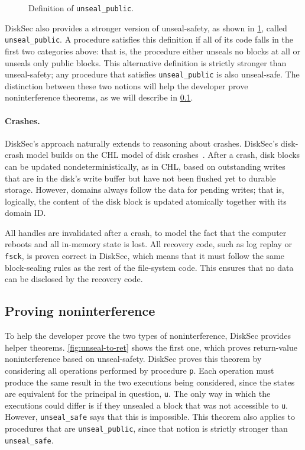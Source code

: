 \begin{figure}[ht]
  
  \caption{Definition of \texttt{unseal\_public}.}
  \label{fig:unseal-public}
\end{figure}

DiskSec also provides a stronger version of unseal-safety, as shown in
\ref{fig:unseal-public}, called \texttt{unseal\_public}.  A procedure
satisfies this definition if all of its code falls in the first two
categories above: that is, the procedure either unseals no blocks
at all or unseals only public blocks.  This alternative definition is
strictly stronger than unseal-safety; any procedure that satisfies
\texttt{unseal\_public} is also unseal-safe.  The distinction between these
two notions will help the developer prove noninterference theorems,
as we will describe in \ref{s:design:prove}.

\paragraph{Crashes.}

DiskSec's approach naturally extends to reasoning about crashes.
DiskSec's disk-crash model builds on the CHL model of disk
crashes~\cite{chen:fscq, chen:dfscq}.  After a crash, disk blocks can
be updated nondeterministically, as in CHL, based on outstanding writes
that are in the disk's write buffer but have not been flushed yet to
durable storage.  However, domains always follow the
data for pending writes; that is, logically, the content of the disk
block is updated atomically together with its domain ID\@.

All handles are invalidated after a crash, to model the fact that the
computer reboots and all in-memory state is lost.  All recovery code,
such as log replay or \texttt{fsck}, is proven correct in DiskSec, which means
that it must follow the same block-sealing rules as the rest of the
file-system code.  This ensures that no data can be disclosed by the
recovery code.


\subsection{Proving noninterference}
\label{s:design:prove}

To help the developer prove the two types of noninterference, DiskSec
provides helper theorems.  \ref{fig:unseal-to-ret} shows the first
one, which proves return-value noninterference based on unseal-safety.
DiskSec proves this theorem by considering all operations performed by
procedure \texttt{p}.  Each operation must produce the same result in the
two executions being considered, since the states are equivalent for the
principal in question, \texttt{u}.  The only way in which the executions
could differ is if they unsealed a block that was not accessible
to \texttt{u}.  However, \texttt{unseal\_safe} says that this is impossible.
This theorem also applies to procedures that are \texttt{unseal\_public},
since that notion is strictly stronger than \texttt{unseal\_safe}.

